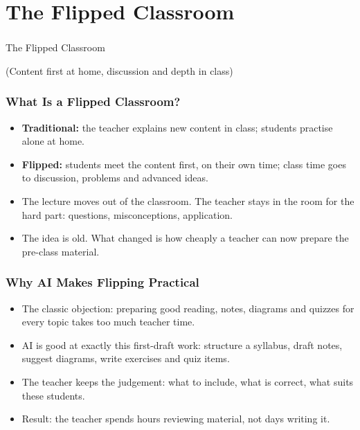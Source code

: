 
\section[Flipped]{The Flipped Classroom}

\begin{frame}[fragile]\frametitle{}
\begin{center}
{\Large The Flipped Classroom}

\medskip
{\small (Content first at home, discussion and depth in class)}
\end{center}
\end{frame}

\begin{frame}[fragile]\frametitle{What Is a Flipped Classroom?}
\begin{itemize}
\item \textbf{Traditional:} the teacher explains new content in class; students practise alone at home.
\item \textbf{Flipped:} students meet the content first, on their own time; class time goes to discussion, problems and advanced ideas.
\item The lecture moves out of the classroom. The teacher stays in the room for the hard part: questions, misconceptions, application.
\item The idea is old. What changed is how cheaply a teacher can now prepare the pre-class material.
\end{itemize}
\end{frame}

\begin{frame}[fragile]\frametitle{Why AI Makes Flipping Practical}
\begin{itemize}
\item The classic objection: preparing good reading, notes, diagrams and quizzes for every topic takes too much teacher time.
\item AI is good at exactly this first-draft work: structure a syllabus, draft notes, suggest diagrams, write exercises and quiz items.
\item The teacher keeps the judgement: what to include, what is correct, what suits these students.
\item Result: the teacher spends hours reviewing material, not days writing it.
\end{itemize}
\end{frame}

